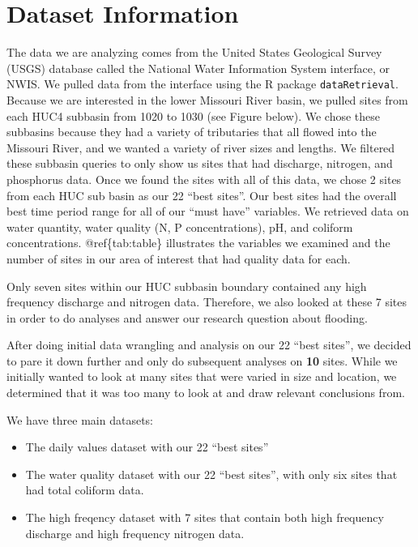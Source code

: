 \documentclass[12pt,]{article}
\begin{document}
\newpage

\hypertarget{dataset-information}{%
\section{Dataset Information}\label{dataset-information}}

The data we are analyzing comes from the United States Geological Survey
(USGS) database called the National Water Information System interface,
or NWIS. We pulled data from the interface using the R package
\texttt{dataRetrieval}. Because we are interested in the lower Missouri
River basin, we pulled sites from each HUC4 subbasin from 1020 to 1030
(see Figure below). We chose these subbasins because they had a variety
of tributaries that all flowed into the Missouri River, and we wanted a
variety of river sizes and lengths. We filtered these subbasin queries
to only show us sites that had discharge, nitrogen, and phosphorus data.
Once we found the sites with all of this data, we chose 2 sites from
each HUC sub basin as our 22 ``best sites''. Our best sites had the
overall best time period range for all of our ``must have'' variables.
We retrieved data on water quantity, water quality (N, P
concentrations), pH, and coliform concentrations. @ref\{tab:table\}
illustrates the variables we examined and the number of sites in our
area of interest that had quality data for each.

Only seven sites within our HUC subbasin boundary contained any high
frequency discharge and nitrogen data. Therefore, we also looked at
these 7 sites in order to do analyses and answer our research question
about flooding.

After doing initial data wrangling and analysis on our 22 ``best
sites'', we decided to pare it down further and only do subsequent
analyses on \textbf{10} sites. While we initially wanted to look at many
sites that were varied in size and location, we determined that it was
too many to look at and draw relevant conclusions from.

We have three main datasets:

\begin{itemize}
\item
  The daily values dataset with our 22 ``best sites''
\item
  The water quality dataset with our 22 ``best sites'', with only six
  sites that had total coliform data.
\item
  The high freqency dataset with 7 sites that contain both high
  frequency discharge and high frequency nitrogen data.
\end{itemize}
\end{document}
